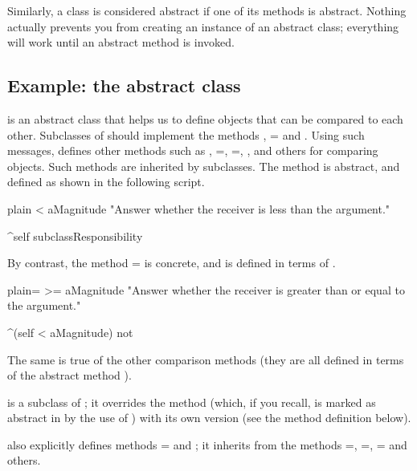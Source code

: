 \documentclass[10pt,twoside,english]{_support/latex/sbabook/sbabook}
\begin{document}
Similarly, a class is considered abstract if one of its methods is abstract.
Nothing actually prevents you from creating an instance of an abstract class;
everything will work until an abstract method is invoked.
\subsection{Example: the abstract class }
 is an abstract class that helps us to define objects that can be
compared to each other. Subclasses of  should implement the
methods \textcode{\textless{}}, \textcode{}= and . Using such messages,  defines
other methods such as \textcode{\textgreater{}}, \textcode{\textgreater{}}=, \textcode{\textless{}}=, , 
 and others for comparing objects. Such methods are inherited
by subclasses. The method  is abstract, and defined as shown in
the following script.

\begin{listing}[float, label=scr:MagnitudeLessThan]{plain}{}
< aMagnitude
    "Answer whether the receiver is less than the argument."

    ^self subclassResponsibility
\end{listing}

By contrast, the method \textcode{\textgreater{}}= is concrete, and is defined in terms of \textcode{\textless{}}.

\begin{listing}[float, label=scr:MagnitudeGTE]{plain}{=}
>= aMagnitude
    "Answer whether the receiver is greater than or equal to the argument."

    ^(self < aMagnitude) not
\end{listing}

The same is true of the other comparison methods (they are all defined in terms
of the abstract method \textcode{\textless{}}).

 is a subclass of ; it overrides the
\textcode{\textless{}} method (which, if you recall, is marked as abstract in  by
the use of ) with its own version (see the
method definition below).

 also explicitly defines methods
\textcode{}= and ; it inherits from  the methods \textcode{\textgreater{}}=, \textcode{\textless{}}=,
\textcode{\textasciitilde{}}= and others.
\end{document}
